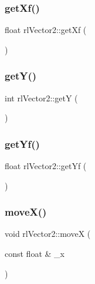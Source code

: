 \subsubsection{\texorpdfstring{get\+Xf()}{getXf()}}
{\footnotesize\ttfamily float rl\+Vector2\+::get\+Xf (\begin{DoxyParamCaption}{ }\end{DoxyParamCaption})}

\mbox{\label{classrl_vector2_a324e941ccfacf8781d0dbe738cb1ff55}} 
\subsubsection{\texorpdfstring{get\+Y()}{getY()}}
{\footnotesize\ttfamily int rl\+Vector2\+::getY (\begin{DoxyParamCaption}{ }\end{DoxyParamCaption})}

\mbox{\label{classrl_vector2_a75d700713286f32ea10657554eb74c88}} 
\subsubsection{\texorpdfstring{get\+Yf()}{getYf()}}
{\footnotesize\ttfamily float rl\+Vector2\+::get\+Yf (\begin{DoxyParamCaption}{ }\end{DoxyParamCaption})}

\mbox{\label{classrl_vector2_acce19919e9ff7b8d871aab5ca23415d3}} 
\subsubsection{\texorpdfstring{move\+X()}{moveX()}}
{\footnotesize\ttfamily void rl\+Vector2\+::moveX (\begin{DoxyParamCaption}\item[{const float \&}]{\+\_\+x }\end{DoxyParamCaption})}

\mbox{\label{classrl_vector2_a22c28c20c86711d8c43d1dcbc7b20636}} 
